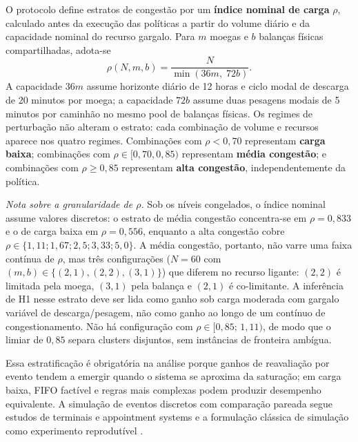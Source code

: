 \documentclass[
  12pt,
  oneside,
  a4paper,
  sumario=tradicional,
  brazil
]{abntex2}
\begin{document}
O protocolo define estratos de congest\~ao por um \textbf{\'indice nominal de carga} $\rho$, calculado antes da execu\c{c}\~ao das pol\'iticas a partir do volume di\'ario e da capacidade nominal do recurso gargalo. Para $m$ moegas e $b$ balan\c{c}as f\'isicas compartilhadas, adota-se
\[
\rho(N,m,b)=\frac{N}{\min(36m,\;72b)}.
\]
A capacidade $36m$ assume horizonte di\'ario de 12 horas e ciclo modal de descarga de 20 minutos por moega; a capacidade $72b$ assume duas pesagens modais de 5 minutos por caminh\~ao no mesmo pool de balan\c{c}as f\'isicas. Os regimes de perturba\c{c}\~ao n\~ao alteram o estrato: cada combina\c{c}\~ao de volume e recursos aparece nos quatro regimes. Combina\c{c}\~oes com $\rho < 0{,}70$ representam \textbf{carga baixa}; combina\c{c}\~oes com $\rho \in [0{,}70,0{,}85)$ representam \textbf{m\'edia congest\~ao}; e combina\c{c}\~oes com $\rho \geq 0{,}85$ representam \textbf{alta congest\~ao}, independentemente da pol\'itica.

\noindent\textit{Nota sobre a granularidade de $\rho$.} Sob os n\'iveis congelados, o \'indice nominal assume valores discretos: o estrato de m\'edia congest\~ao concentra-se em $\rho=0{,}833$ e o de carga baixa em $\rho=0{,}556$, enquanto a alta congest\~ao cobre $\rho \in \{1{,}11;\allowbreak 1{,}67;\allowbreak 2{,}5;\allowbreak 3{,}33;\allowbreak 5{,}0\}$. A m\'edia congest\~ao, portanto, n\~ao varre uma faixa cont\'inua de $\rho$, mas tr\^es configura\c{c}\~oes ($N=60$ com $(m,b)\in\{(2,1),(2,2),(3,1)\}$) que diferem no recurso ligante: $(2,2)$ \'e limitada pela moega, $(3,1)$ pela balan\c{c}a e $(2,1)$ \'e co-limitante. A infer\^encia de H1 nesse estrato deve ser lida como ganho sob carga moderada com gargalo vari\'avel de descarga/pesagem, n\~ao como ganho ao longo de um cont\'inuo de congestionamento. N\~ao h\'a configura\c{c}\~ao com $\rho \in [0{,}85;\,1{,}11)$, de modo que o limiar de $0{,}85$ separa clusters disjuntos, sem inst\^ancias de fronteira amb\'igua.

Essa estratifica\c{c}\~ao \'e obrigat\'oria na an\'alise porque ganhos de reavalia\c{c}\~ao por evento tendem a emergir quando o sistema se aproxima da satura\c{c}\~ao; em carga baixa, FIFO fact\'ivel e regras mais complexas podem produzir desempenho equivalente. A simula\c{c}\~ao de eventos discretos com compara\c{c}\~ao pareada segue estudos de terminais e appointment systems \parencite{bettDiscreteEventSimulation2024a, bettSimulationbasedOptimizationTruck2024a, neagoeUsingDiscreteeventSimulation2021a} e a formula\c{c}\~ao cl\'assica de simula\c{c}\~ao como experimento reprodut\'ivel \parencite{lawSimulationModelingAnalysis2015}.
\end{document}
